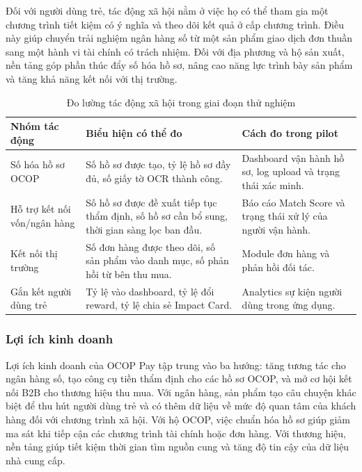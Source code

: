 \documentclass[13pt,a4paper]{extarticle}
\begin{document}
Đối với người dùng trẻ, tác động xã hội nằm ở việc họ có thể tham gia một chương trình tiết kiệm có ý nghĩa và theo dõi kết quả ở cấp chương trình. Điều này giúp chuyển trải nghiệm ngân hàng số từ một sản phẩm giao dịch đơn thuần sang một hành vi tài chính có trách nhiệm. Đối với địa phương và hộ sản xuất, nền tảng góp phần thúc đẩy số hóa hồ sơ, nâng cao năng lực trình bày sản phẩm và tăng khả năng kết nối với thị trường.

\begin{table}[H]
\centering
\caption{Đo lường tác động xã hội trong giai đoạn thử nghiệm}
\begin{tabular}{|p{3.5cm}|p{6cm}|p{5cm}|}
\hline
\textbf{Nhóm tác động} & \textbf{Biểu hiện có thể đo} & \textbf{Cách đo trong pilot} \\
\hline
Số hóa hồ sơ OCOP & Số hồ sơ được tạo, tỷ lệ hồ sơ đầy đủ, số giấy tờ OCR thành công. & Dashboard vận hành hồ sơ, log upload và trạng thái xác minh. \\
\hline
Hỗ trợ kết nối vốn/ngân hàng & Số hồ sơ được đề xuất tiếp tục thẩm định, số hồ sơ cần bổ sung, thời gian sàng lọc ban đầu. & Báo cáo Match Score và trạng thái xử lý của người vận hành. \\
\hline
Kết nối thị trường & Số đơn hàng được theo dõi, số sản phẩm vào danh mục, số phản hồi từ bên thu mua. & Module đơn hàng và phản hồi đối tác. \\
\hline
Gắn kết người dùng trẻ & Tỷ lệ vào dashboard, tỷ lệ đổi reward, tỷ lệ chia sẻ Impact Card. & Analytics sự kiện người dùng trong ứng dụng. \\
\hline
\end{tabular}
\end{table}

\subsubsection{Lợi ích kinh doanh}

Lợi ích kinh doanh của OCOP Pay tập trung vào ba hướng: tăng tương tác cho ngân hàng số, tạo công cụ tiền thẩm định cho các hồ sơ OCOP, và mở cơ hội kết nối B2B cho thương hiệu thu mua. Với ngân hàng, sản phẩm tạo câu chuyện khác biệt để thu hút người dùng trẻ và có thêm dữ liệu về mức độ quan tâm của khách hàng đối với chương trình xã hội. Với hộ OCOP, việc chuẩn hóa hồ sơ giúp giảm ma sát khi tiếp cận các chương trình tài chính hoặc đơn hàng. Với thương hiệu, nền tảng giúp tiết kiệm thời gian tìm nguồn cung và tăng độ tin cậy của dữ liệu nhà cung cấp.
\end{document}
